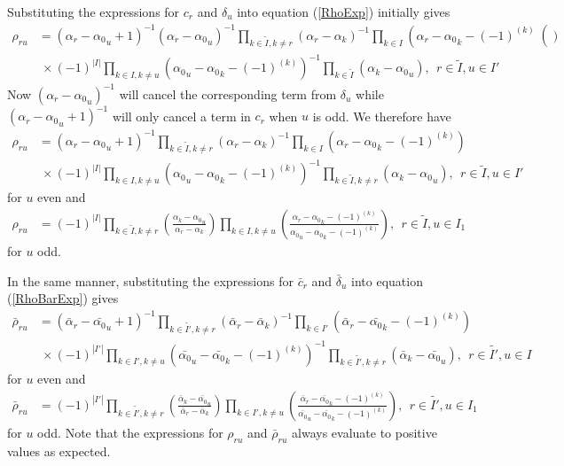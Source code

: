 \documentclass[12pt]{article}
\begin{document}
Substituting the expressions for ${c}_r$ and ${\delta}_u$ into equation 
 (\ref{RhoExp}) initially gives
\begin{align*}
{\rho}_{ru} &= ({\alpha}_r-{\alpha_0}_u + 1)^{-1}({\alpha}_r-{\alpha_0}_u)^{-1} \prod_{k\in \tilde{I},k\neq r} \left(\alpha_r - \alpha_k \right)^{-1}\prod_{k\in
I} \left(\alpha_r - {\alpha_0}_k - (-1)^{(k)}\right() \\
& ~\times (-1)^{|I|} \prod_{k\in I,k\neq u} \left({\alpha_0}_u - {\alpha_0}_k -
(-1)^{(k)}\right)^{-1}\prod_{k\in\tilde{I}} \left(\alpha_k - {\alpha_0}_u \right),\ \ r\in \tilde{I},u\in I' 
\end{align*}
Now $({\alpha}_r-{\alpha_0}_u)^{-1}$ will cancel the corresponding term from $\delta_u$ while $
({\alpha}_r-{\alpha_0}_u + 1)^{-1}$ will only cancel a term in $c_r$ when $u$ is odd. We therefore have
\begin{align*}
{\rho}_{ru} &= ({\alpha}_r-{\alpha_0}_u + 1)^{-1}\prod_{k\in \tilde{I},k\neq r} \left(\alpha_r - \alpha_k \right)^{-1}\prod_{k\in
I} \left(\alpha_r - {\alpha_0}_k - (-1)^{(k)}\right) \\
& ~\times (-1)^{|I|} \prod_{k\in I,k\neq u} \left({\alpha_0}_u - {\alpha_0}_k -
(-1)^{(k)}\right)^{-1}\prod_{k\in\tilde{I},k \neq r} \left(\alpha_k - {\alpha_0}_u \right),\ \ r\in \tilde{I},u\in I' 
\end{align*}
for $u$ even and
\begin{align*}
{\rho}_{ru} &= (-1)^{|I|} \prod_{k\in \tilde{I},k\neq r} 
\left(
\frac 
{\alpha_k - {\alpha_0}_u  }
{\alpha_r - \alpha_k }
\right)
\prod_{k\in I,k \neq u} 
\left(
\frac
{ \alpha_r - {\alpha_0}_k - (-1)^{(k)} }
{{\alpha_0}_u - {\alpha_0}_k - (-1)^{(k)} }
\right)
,\ \ r\in \tilde{I},u\in I_1
\end{align*}
for $u$ odd.

In the same manner, substituting the expressions for $\bar{c}_r$ and $\bar{\delta}_u$ into equation 
 (\ref{RhoBarExp}) gives
\begin{align*}
\bar{\rho}_{ru} &= (\bar{\alpha}_r-\bar{\alpha_0}_u + 1)^{-1}\prod_{k\in \tilde{I'},k\neq r} \left(\bar{\alpha}_r - \bar{\alpha}_k \right)^{-1}\prod_{k\in
I'} \left(\bar{\alpha}_r - \bar{\alpha_0}_k - (-1)^{(k)}\right) \\
& ~\times (-1)^{|I'|} \prod_{k\in I',k\neq u} \left(\bar{\alpha_0}_u - \bar{\alpha_0}_k -
(-1)^{(k)}\right)^{-1}\prod_{k\in\tilde{I'},k \neq r} \left(\bar{\alpha}_k - \bar{\alpha_0}_u \right),\ \ r\in \tilde{I'},u\in I 
\end{align*}
for $u$ even and
\begin{align*}
\bar{\rho}_{ru} &= (-1)^{|I'|} \prod_{k\in \tilde{I'},k\neq r} 
\left(
\frac 
{\bar{\alpha}_k - \bar{\alpha_0}_u  }
{\bar{\alpha}_r - \bar{\alpha}_k }
\right)
\prod_{k\in I',k \neq u} 
\left(
\frac
{ \bar{\alpha}_r - \bar{\alpha_0}_k - (-1)^{(k)} }
{\bar{\alpha_0}_u - \bar{\alpha_0}_k - (-1)^{(k)} }
\right)
,\ \ r\in \tilde{I'},u\in I_1
\end{align*}
for $u$ odd. Note that the expressions for $\rho_{ru}$ and $\bar{\rho}_{ru}$ always evaluate to positive values as expected.
\end{document}
